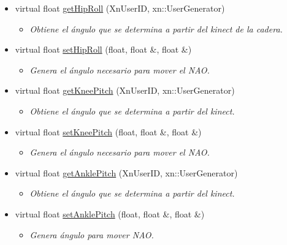 \begin{itemize}
\item 
virtual float \hyperlink{class_r_leg_a983e8da29c577737694dc72a9573fc5c}{get\-Hip\-Roll} (\-Xn\-User\-I\-D, xn\-::\-User\-Generator)
\begin{itemize}\small\item\em \-Obtiene el ángulo que se determina a partir del kinect de la cadera. \end{itemize}\item 
\hypertarget{class_r_leg_a44386f31cf1afb03ab3f433a0189d820}{virtual float \hyperlink{class_r_leg_a44386f31cf1afb03ab3f433a0189d820}{set\-Hip\-Roll} (float, float \&, float \&)}\label{class_r_leg_a44386f31cf1afb03ab3f433a0189d820}

\begin{itemize}\small\item\em \-Genera el ángulo necesario para mover el \-N\-A\-O. \end{itemize}\item 
\hypertarget{class_r_leg_a1e66a29fe07ec16275f86bffe7482fee}{virtual float \hyperlink{class_r_leg_a1e66a29fe07ec16275f86bffe7482fee}{get\-Knee\-Pitch} (\-Xn\-User\-I\-D, xn\-::\-User\-Generator)}\label{class_r_leg_a1e66a29fe07ec16275f86bffe7482fee}

\begin{itemize}\small\item\em \-Obtiene el ángulo que se determina a partir del kinect. \end{itemize}\item 
\hypertarget{class_r_leg_a65c0d913ed2c07515cd178b190b4287c}{virtual float \hyperlink{class_r_leg_a65c0d913ed2c07515cd178b190b4287c}{set\-Knee\-Pitch} (float, float \&, float \&)}\label{class_r_leg_a65c0d913ed2c07515cd178b190b4287c}

\begin{itemize}\small\item\em \-Genera el ángulo necesario para mover el \-N\-A\-O. \end{itemize}\item 
\hypertarget{class_r_leg_aa8a63cd3f3d06ace1566a531b5213860}{virtual float \hyperlink{class_r_leg_aa8a63cd3f3d06ace1566a531b5213860}{get\-Ankle\-Pitch} (\-Xn\-User\-I\-D, xn\-::\-User\-Generator)}\label{class_r_leg_aa8a63cd3f3d06ace1566a531b5213860}

\begin{itemize}\small\item\em \-Obtiene el ángulo que se determina a partir del kinect. \end{itemize}\item 
\hypertarget{class_r_leg_a6ac413efc8dc05dce14096d9797f9149}{virtual float \hyperlink{class_r_leg_a6ac413efc8dc05dce14096d9797f9149}{set\-Ankle\-Pitch} (float, float \&, float \&)}\label{class_r_leg_a6ac413efc8dc05dce14096d9797f9149}

\begin{itemize}\small\item\em \-Genera ángulo para mover \-N\-A\-O. \end{itemize}\end{itemize}


